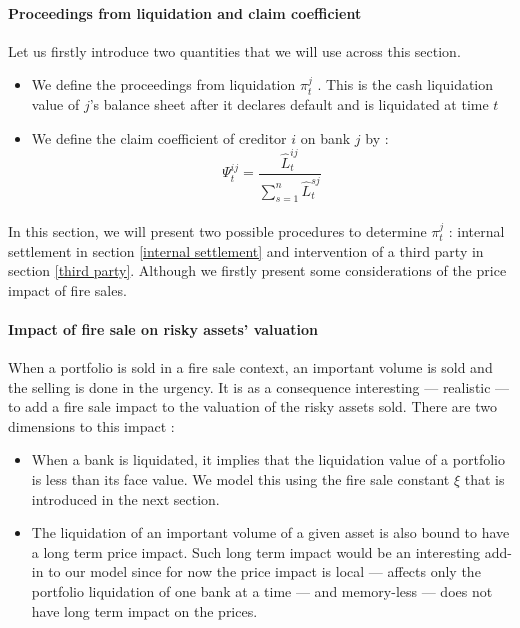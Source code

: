 \documentclass{article}
\newcommand{\wh}{\widehat}
\begin{document}
\paragraph{Proceedings from liquidation and claim coefficient}
Let us firstly introduce two quantities that we will use across this section. 

\begin{itemize}

\item We define the proceedings from liquidation $\pi_t^j$ . This is the cash liquidation value of $j$'s balance sheet after it declares default and is liquidated at time $t$
\item We define the claim coefficient of creditor $i$ on bank $j$ by :
$$\Psi_t^{ij} = \frac{\wh L_t^{ij}}{\sum_{s=1}^n \wh L_t^{sj}} $$

\end{itemize}

\paragraph{}
In this section, we will present two possible procedures to determine $\pi_t^j$ : internal settlement in section \ref{internal settlement} and intervention of a third party in section \ref{third party}. Although we firstly present some considerations of the price impact of fire sales.

\paragraph{Impact of fire sale on risky assets' valuation}
When a portfolio is sold in a fire sale context, an important volume is sold and the selling is done in the urgency. It is as a consequence interesting --- realistic --- to add a fire sale impact to the valuation of the risky assets sold. There are two dimensions to this impact :
\begin{itemize}
    \item When a bank is liquidated, it implies that the liquidation value of a portfolio is less than its face value. We model this using the fire sale constant $\xi$ that is introduced in the next section.
    \item The liquidation of an important volume of a given asset is also bound to have a long term price impact. Such long term impact would be an interesting add-in to our model since for now the price impact is local --- affects only the portfolio liquidation of one bank at a time --- and memory-less --- does not have long term impact on the prices.
\end{itemize}
\end{document}
